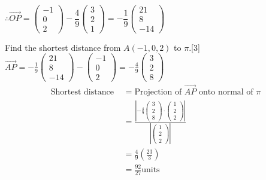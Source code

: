 \documentclass[12pt, a4 paper]{article}
\begin{document}
\begin{outline}[enumerate]
\begin{align*}
					\end{align*}
					$\therefore \overrightarrow {OP}  = \left( {\begin{array}{*{20}{c}}{ - 1}\\0\\2\end{array}} \right) - \dfrac{4}{9}\left( {\begin{array}{*{20}{c}}3\\2\\1\end{array}} \right) =  - \dfrac{1}{9}\left( {\begin{array}{*{20}{c}}{21}\\8\\{ - 14}\end{array}} \right)$

					\color{black}
					\2 Find the shortest distance from $A( - 1,0,2)$ to $\pi $.\hfill[3]
					\color{blue}\\
					$\overrightarrow {AP} =  - \frac{1}{9}\left( {\begin{array}{*{20}{c}}{21} \\8\\{ - 14}\end{array}} \right) - \left( {\begin{array}{*{20}{c}}{ - 1}\\0\\2\end{array}} \right) =  - \frac{4}{9}\left( {\begin{array}{*{20}{c}}3\\2\\8\end{array}} \right)$\\
					\begin{align*}
						{\textrm{Shortest distance }} & =  {\textrm{Projection of }}\overrightarrow {AP} {\textrm{ onto normal of }}\pi \\ &= \frac{{\left| { - \frac{4}{9}\left( {\begin{array}{*{20}{c}}3\\2\\8\end{array}} \right) \cdot \left( {\begin{array}{*{20}{c}}1\\2\\2\end{array}} \right)} \right|}}{{\left| {\left( {\begin{array}{*{20}{c}}1\\2\\2\end{array}} \right)} \right|}}\\ &= \frac{4}{9}\left( {\frac{{23}}{3}} \right)\\ &= \frac{{92}}{{27}}{\textrm{units}}

\end{align*}
\end{outline}
\end{document}
